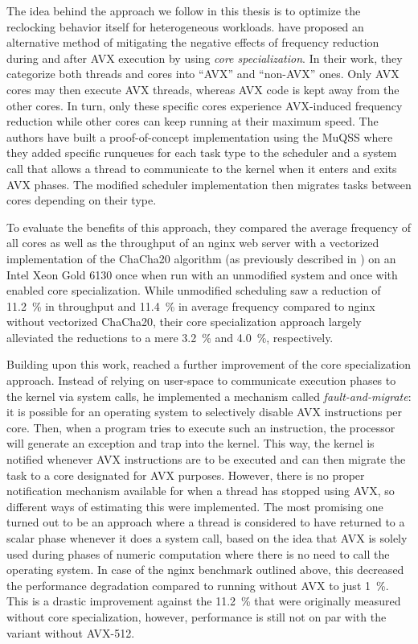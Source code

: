 {The idea behind the approach we follow in this thesis is to optimize the reclocking behavior itself for heterogeneous workloads. \citeauthor{gottschlag19sfma} \cite{gottschlag19sfma} have proposed an alternative method of mitigating the negative effects of frequency reduction during and after \gls{AVX} execution by using \emph{core specialization}. In their work, they categorize both threads and cores into \enquote{AVX} and \enquote{non-AVX} ones. Only AVX cores may then execute AVX threads, whereas AVX code is kept away from the other cores. In turn, only these specific cores experience \gls{AVX}-induced frequency reduction while other cores can keep running at their maximum speed. The authors have built a proof-of-concept implementation using the \gls{MuQSS} where they added specific runqueues for each task type to the scheduler and a system call that allows a thread to communicate to the kernel when it enters and exits \gls{AVX} phases. The modified scheduler implementation then migrates tasks between cores depending on their type.

To evaluate the benefits of this approach, they compared the average frequency of all cores as well as the throughput of an nginx web server with a vectorized implementation of the ChaCha20 algorithm (as previously described in ) on an Intel Xeon Gold 6130 once when run with an unmodified system and once with enabled core specialization. While unmodified scheduling saw a reduction of \SI{11.2}{\percent} in throughput and \SI{11.4}{\percent} in average frequency compared to nginx without vectorized ChaCha20, their core specialization approach largely alleviated the reductions to a mere \SI{3.2}{\percent} and \SI{4.0}{\percent}, respectively.

Building upon this work, \citeauthor{brantsch19corespecialization} \cite{brantsch19corespecialization} reached a further improvement of the core specialization approach. Instead of relying on user-space to communicate execution phases to the kernel via system calls, he implemented a mechanism called \emph{fault-and-migrate}: it is possible for an operating system to selectively disable \gls{AVX} instructions per core. Then, when a program tries to execute such an instruction, the processor will generate an exception and trap into the kernel. This way, the kernel is notified whenever \gls{AVX} instructions are to be executed and can then migrate the task to a core designated for \gls{AVX} purposes. However, there is no proper notification mechanism available for when a thread has stopped using \gls{AVX}, so different ways of estimating this were implemented. The most promising one turned out to be an approach where a thread is considered to have returned to a scalar phase whenever it does a system call, based on the idea that \gls{AVX} is solely used during phases of numeric computation where there is no need to call the operating system. In case of the nginx benchmark outlined above, this decreased the performance degradation compared to running without \gls{AVX} to just \SI{1}{\percent}. This is a drastic improvement against the \SI{11.2}{\percent} that were originally measured without core specialization, however, performance is still not on par with the variant without \gls{AVX-512}.

}
